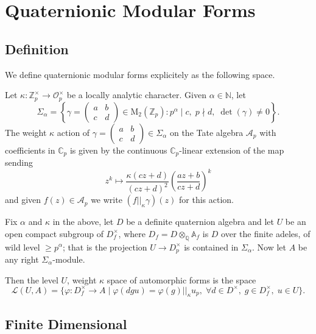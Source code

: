\chapter{Quaternionic Modular Forms}

\section{Definition}

We define quaternionic modular forms explicitely as the following space.

\begin{definition}
  Let $\kappa : \mathbb{Z}_p^\times \to \mathcal{O}_p^\times$ be a locally analytic character.
  Given $\alpha \in \mathbb{N}$, let
  \[
    \Sigma_\alpha = \left\{ \gamma =  \begin{pmatrix}
      a & b \\
      c & d
    \end{pmatrix}
    \in \text{M}_2(\mathbb{Z}_p) : p^\alpha \mid c, \; p \nmid d, \; \det (\gamma) \neq 0 \right\}.
  \]
  The weight $\kappa$ action of $\gamma =  \begin{pmatrix} a & b \\ c & d \end{pmatrix} \in
  \Sigma_\alpha$ on the Tate algebra $\mathcal{A}_p$ with coefficients in $\mathbb{C}_p$ is given by
  the continuous $\mathbb{C}_p$-linear extension of the map sending
  \[
    z^k \mapsto \frac{\kappa(c z + d)}{(cz + d)^2} \left( \frac{az+b}{cz+d} \right)^k
  \]
  and given $f(z) \in \mathcal{A}_p$ we write $(f||_\kappa \gamma)(z)$ for this action.

  Fix $\alpha$ and $\kappa$ in the above, let $D$ be a definite quaternion algebra and let $U$ be
  an open compact subgroup of $D_f^\times$, where $D_f = D  \otimes_\mathbb{Q} \mathbb{A}_f$ is $D$
  over the finite adeles, of wild level $\geq p^\alpha$; that is the projection $U \to D_p^\times$
  is contained in $\Sigma_\alpha.$ Now let $A$ be any right $\Sigma_\alpha$-module.

  Then the level $U$, weight $\kappa$ space of automorphic forms is the space
  \[
    \mathcal{L}(U,A) = \{ \varphi : D_f^\times \to A  \;  | \; \varphi (dgu) = \varphi (g)
    ||_\kappa u_p, \; \forall d \in D^\times, \; g \in D^\times_f, \; u \in U \}.
  \]
\end{definition}

\section{Finite Dimensional}

